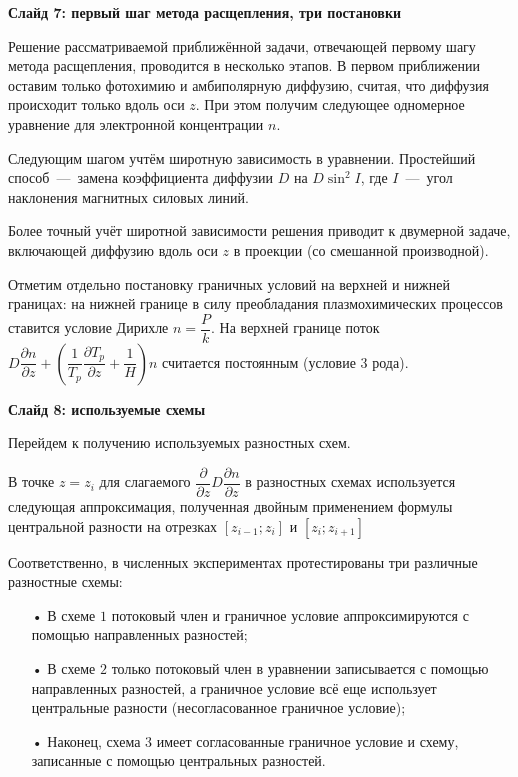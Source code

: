 \documentclass[2pt, a4paper, fleqn]{extarticle}
\begin{document}
\medskip

{\bf Слайд 7: первый шаг метода расщепления, три постановки}

Решение рассматриваемой приближённой задачи, отвечающей первому шагу метода расщепления, проводится в несколько этапов. В первом приближении оставим только фотохимию и амбиполярную диффузию, считая, что диффузия происходит только вдоль оси $z$. При этом получим следующее одномерное уравнение для электронной концентрации $n$.

Следующим шагом учтём широтную зависимость в уравнении. Простейший способ~---~замена коэффициента диффузии $D$ на $D\sin^2I$, где $I$~---~угол наклонения магнитных силовых линий.

Более точный учёт широтной зависимости решения приводит к двумерной задаче, включающей диффузию вдоль оси $z$ в проекции (со смешанной производной).

Отметим отдельно постановку граничных условий на верхней и нижней границах: на нижней границе в силу преобладания плазмохимических процессов ставится условие Дирихле $n = \dfrac{P}{k}$. На верхней границе поток $D\dfrac{\partial n}{\partial z} + \left(\dfrac{1}{T_p}\dfrac{\partial T_p}{\partial z} + \dfrac{1}{H}\right)n$ считается постоянным (условие 3 рода).

\medskip

{\bf Слайд 8: используемые схемы}

Перейдем к получению используемых разностных схем. 


В точке $z=z_i$ для слагаемого $\dfrac{\partial}{\partial z}D\dfrac{\partial n}{\partial z}$ в разностных схемах используется следующая аппроксимация, полученная двойным применением формулы центральной разности на отрезках $[z_{i-1};z_i]$ и $[z_i; z_{i+1}]$

Соответственно, в численных экспериментах протестированы три различные разностные схемы: 
\begin{itemize}
\item[•] В схеме $1$ потоковый член и граничное условие аппроксимируются с помощью направленных разностей; 
\item[•] В схеме $2$ только потоковый член в уравнении записывается с помощью направленных разностей, а граничное условие всё еще использует центральные разности (несогласованное граничное условие);
\item[•] Наконец, схема $3$ имеет согласованные граничное условие и схему, записанные с помощью центральных разностей.
\end{itemize}
\end{document}
